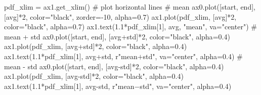 \documentclass[
  letterpaper,
  DIV=11,
  numbers=noendperiod,
  oneside]{scrreprt}
\newenvironment{Shaded}{\begin{snugshade}}{\end{snugshade}}
\newcommand{\CommentTok}[1]{\textcolor[rgb]{0.37,0.37,0.37}{#1}}
\newcommand{\DecValTok}[1]{\textcolor[rgb]{0.68,0.00,0.00}{#1}}
\newcommand{\FloatTok}[1]{\textcolor[rgb]{0.68,0.00,0.00}{#1}}
\newcommand{\NormalTok}[1]{\textcolor[rgb]{0.00,0.23,0.31}{#1}}
\newcommand{\OperatorTok}[1]{\textcolor[rgb]{0.37,0.37,0.37}{#1}}
\newcommand{\StringTok}[1]{\textcolor[rgb]{0.13,0.47,0.30}{#1}}
\newcommand{\VerbatimStringTok}[1]{\textcolor[rgb]{0.13,0.47,0.30}{#1}}
\begin{document}
\begin{Shaded}
\begin{Highlighting}[]
\NormalTok{pdf\_xlim }\OperatorTok{=}\NormalTok{ ax1.get\_xlim()}
\CommentTok{\# plot horizontal lines}
\CommentTok{\# mean}
\NormalTok{ax0.plot([start, end], [avg]}\OperatorTok{*}\DecValTok{2}\NormalTok{, color}\OperatorTok{=}\StringTok{"black"}\NormalTok{, zorder}\OperatorTok{={-}}\DecValTok{10}\NormalTok{, alpha}\OperatorTok{=}\FloatTok{0.7}\NormalTok{)}
\NormalTok{ax1.plot(pdf\_xlim, [avg]}\OperatorTok{*}\DecValTok{2}\NormalTok{, color}\OperatorTok{=}\StringTok{"black"}\NormalTok{, alpha}\OperatorTok{=}\FloatTok{0.7}\NormalTok{)}
\NormalTok{ax1.text(}\FloatTok{1.1}\OperatorTok{*}\NormalTok{pdf\_xlim[}\DecValTok{1}\NormalTok{], avg, }\StringTok{"mean"}\NormalTok{, va}\OperatorTok{=}\StringTok{"center"}\NormalTok{)}
\CommentTok{\# mean + std}
\NormalTok{ax0.plot([start, end], [avg}\OperatorTok{+}\NormalTok{std]}\OperatorTok{*}\DecValTok{2}\NormalTok{, color}\OperatorTok{=}\StringTok{"black"}\NormalTok{, alpha}\OperatorTok{=}\FloatTok{0.4}\NormalTok{)}
\NormalTok{ax1.plot(pdf\_xlim, [avg}\OperatorTok{+}\NormalTok{std]}\OperatorTok{*}\DecValTok{2}\NormalTok{, color}\OperatorTok{=}\StringTok{"black"}\NormalTok{, alpha}\OperatorTok{=}\FloatTok{0.4}\NormalTok{)}
\NormalTok{ax1.text(}\FloatTok{1.1}\OperatorTok{*}\NormalTok{pdf\_xlim[}\DecValTok{1}\NormalTok{], avg}\OperatorTok{+}\NormalTok{std, }\VerbatimStringTok{r"mean$+$std"}\NormalTok{, va}\OperatorTok{=}\StringTok{"center"}\NormalTok{, alpha}\OperatorTok{=}\FloatTok{0.4}\NormalTok{)}
\CommentTok{\# mean {-} std}
\NormalTok{ax0.plot([start, end], [avg}\OperatorTok{{-}}\NormalTok{std]}\OperatorTok{*}\DecValTok{2}\NormalTok{, color}\OperatorTok{=}\StringTok{"black"}\NormalTok{, alpha}\OperatorTok{=}\FloatTok{0.4}\NormalTok{)}
\NormalTok{ax1.plot(pdf\_xlim, [avg}\OperatorTok{{-}}\NormalTok{std]}\OperatorTok{*}\DecValTok{2}\NormalTok{, color}\OperatorTok{=}\StringTok{"black"}\NormalTok{, alpha}\OperatorTok{=}\FloatTok{0.4}\NormalTok{)}
\NormalTok{ax1.text(}\FloatTok{1.1}\OperatorTok{*}\NormalTok{pdf\_xlim[}\DecValTok{1}\NormalTok{], avg}\OperatorTok{{-}}\NormalTok{std, }\VerbatimStringTok{r"mean${-}$std"}\NormalTok{, va}\OperatorTok{=}\StringTok{"center"}\NormalTok{, alpha}\OperatorTok{=}\FloatTok{0.4}\NormalTok{)}


\end{Highlighting}
\end{Shaded}
\end{document}
